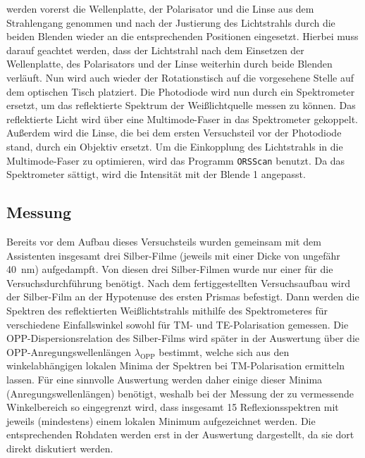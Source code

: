 werden vorerst die Wellenplatte, der Polarisator und die Linse aus dem Strahlengang genommen und nach der Justierung des Lichtstrahls durch die beiden
Blenden wieder an die entsprechenden Positionen eingesetzt. Hierbei muss darauf geachtet werden, dass der Lichtstrahl nach dem Einsetzen der Wellenplatte,
des Polarisators und der Linse weiterhin durch beide Blenden verläuft. Nun wird auch wieder der Rotationstisch auf die vorgesehene Stelle auf dem optischen
Tisch platziert. Die Photodiode wird nun durch ein Spektrometer ersetzt, um das reflektierte Spektrum der Weißlichtquelle messen zu können.
Das reflektierte Licht wird über eine Multimode-Faser in das Spektrometer gekoppelt. Außerdem wird die Linse, die bei dem ersten Versuchsteil vor der Photodiode stand,
durch ein Objektiv ersetzt. Um die Einkopplung des Lichtstrahls in die Multimode-Faser zu optimieren, wird das Programm \texttt{ORSScan} benutzt. Da
das Spektrometer sättigt, wird die Intensität mit der Blende 1 angepasst.
\subsection{Messung}\label{subsec:teil2_messung}
Bereits vor dem Aufbau dieses Versuchsteils wurden gemeinsam mit dem Assistenten insgesamt drei Silber-Filme (jeweils mit einer Dicke von ungefähr \SI{40}{\nm}) aufgedampft. Von diesen drei Silber-Filmen wurde
nur einer für die Versuchsdurchführung benötigt. Nach dem fertiggestellten Versuchsaufbau wird der Silber-Film an der Hypotenuse des ersten Prismas befestigt.
Dann werden die Spektren des reflektierten Weißlichtstrahls mithilfe des Spektrometeres für verschiedene Einfallswinkel sowohl für TM- und TE-Polarisation gemessen.
Die OPP-Dispersionsrelation des Silber-Films wird später in der Auswertung über die OPP-Anregungswellenlängen $\lambda_{\mathrm{OPP}}$ bestimmt, welche sich
aus den winkelabhängigen lokalen Minima der Spektren bei TM-Polarisation ermitteln lassen. Für eine sinnvolle Auswertung werden daher einige dieser Minima (Anregungswellenlängen) benötigt,
weshalb bei der Messung der zu vermessende Winkelbereich so eingegrenzt wird, dass insgesamt 15 Reflexionsspektren mit jeweils (mindestens) einem lokalen Minimum aufgezeichnet werden.
Die entsprechenden Rohdaten werden erst in der Auswertung dargestellt, da sie dort direkt diskutiert werden.
